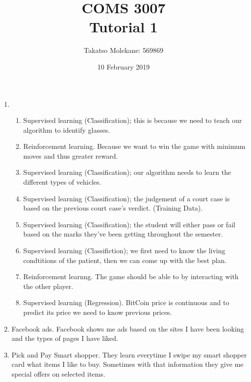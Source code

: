 \documentclass[10pt]{article}
\title{COMS 3007\\ Tutorial 1}
\author{Takatso Molekane: 569869}
\date{10 February 2019}
\begin{document}
	\maketitle
	
	\begin{enumerate}
	\item
		\begin{enumerate}
			\item Supervised learning (Classification); this is because we need to teach our algorithm to identify glasses.
			\item Reinforcement learning. Because we want to win the game with minimum moves and thus greater reward.
			\item Supervised learning (Classification); our algorithm needs to learn the different types of vehicles.
			\item Supervised learning (Classification); the judgement of a court case is based on the previous court case's verdict. (Training Data).
			\item Supervised learning (Classification); the student will either pass or fail based on the marks they've been getting throughout the semester.
			\item Supervised learning (Classifiction); we first need  to know the living condtitions of the patient, then we can come up with the best plan.
			\item Reinforcement learnng. The game should be able to by interacting with the other player.
			\item Supervised learning (Regression). BitCoin price is continuous and to predict its price we need to know previous prices.
		\end{enumerate}
		
	\item Facebook ads. Facebook shows me ads based on the sites I have been looking and the types of pages I have liked.
	
	\item Pick and Pay Smart shopper. They learn everytime I swipe my smart shopper card what items I like to buy. Sometimes with that information they give me special offers on selected items.
	

\end{enumerate}
\end{document}

